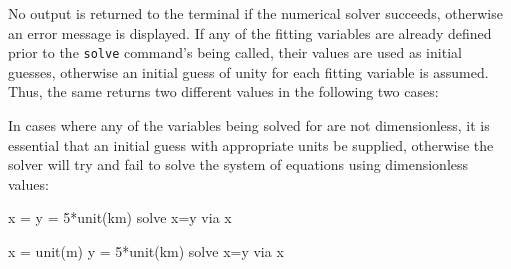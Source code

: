 \vspace{3mm}
\newline
{}\newline
{}\newline
{}\newline
{}
\vspace{3mm}

\noindent No output is returned to the terminal if the numerical solver
succeeds, otherwise an error message is displayed. If any of the fitting
variables are already defined prior to the {\tt solve} command's being called,
their values are used as initial guesses, otherwise an initial guess of unity
for each fitting variable is assumed. Thus, the same  returns
two different values in the following two cases:

\vspace{3mm}
\newline
{}\newline
{}\newline
{}\newline
{}\newline
{}\newline
{}\newline
{}
\vspace{3mm}

\noindent In cases where any of the variables being solved for are not
dimensionless, it is essential that an initial guess with appropriate units be
supplied, otherwise the solver will try and fail to solve the system of
equations using dimensionless values:

\begin{dontdo}
x =\newline
y = 5*unit(km)\newline
solve x=y via x
\end{dontdo}

\begin{dodo}
x = unit(m)\newline
y = 5*unit(km)\newline
solve x=y via x
\end{dodo}

